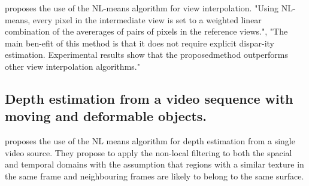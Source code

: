 \documentclass[11pt]{article}
\begin{document}
\cite{Dehghannasiri_2013} proposes the use of the NL-means algorithm for view interpolation. "Using NL-means, every pixel in the intermediate view is set to a weighted linear combination of the avererages of pairs of pixels in the reference views.", "The main ben-efit of this method is that it does not require explicit dispar-ity estimation.  Experimental results show that the proposedmethod outperforms other view interpolation algorithms."

\subsection{Depth estimation from a video sequence with moving and deformable objects.}

\cite{Martinello_2012} proposes the use of the NL means algorithm for depth estimation from a single video source. They propose to apply the non-local filtering to both the spacial and temporal domains with the assumption that regions with a similar texture in the same frame and neighbouring frames are likely to belong to the same surface. 



\end{document}
